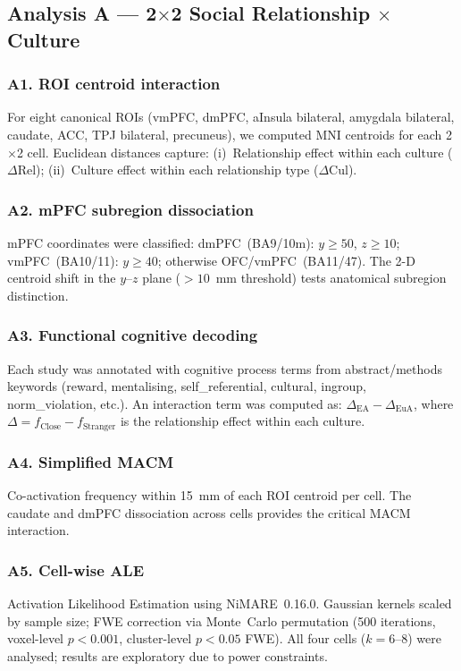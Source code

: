 \documentclass[11pt,a4paper]{article}
\begin{document}
\subsection{Analysis A — 2$\times$2 Social Relationship $\times$ Culture}

\subsubsection{A1. ROI centroid interaction}
For eight canonical ROIs (vmPFC, dmPFC, aInsula bilateral, amygdala bilateral, caudate,
ACC, TPJ bilateral, precuneus), we computed MNI centroids for each 2$\times$2 cell.
Euclidean distances capture: (i)~Relationship effect within each culture ($\Delta$Rel);
(ii)~Culture effect within each relationship type ($\Delta$Cul).

\subsubsection{A2. mPFC subregion dissociation}
mPFC coordinates were classified: dmPFC~(BA9/10m): $y\geq50$, $z\geq10$; vmPFC~(BA10/11):
$y\geq40$; otherwise OFC/vmPFC~(BA11/47). The 2-D centroid shift in the $y$--$z$ plane
($>10$~mm threshold) tests anatomical subregion distinction.

\subsubsection{A3. Functional cognitive decoding}
Each study was annotated with cognitive process terms from abstract/methods keywords
(reward, mentalising, self\_referential, cultural, ingroup, norm\_violation, etc.).
An interaction term was computed as: $\Delta_{\text{EA}} - \Delta_{\text{EuA}}$, where
$\Delta = f_{\text{Close}} - f_{\text{Stranger}}$ is the relationship effect within
each culture.

\subsubsection{A4. Simplified MACM}
Co-activation frequency within 15~mm of each ROI centroid per cell. The caudate and dmPFC
dissociation across cells provides the critical MACM interaction.

\subsubsection{A5. Cell-wise ALE}
Activation Likelihood Estimation \citep{Salo2023} using NiMARE~0.16.0. Gaussian kernels
scaled by sample size; FWE correction via Monte~Carlo permutation (500 iterations,
voxel-level $p<0.001$, cluster-level $p<0.05$ FWE). All four cells ($k=6$--8) were analysed;
results are exploratory due to power constraints.
\end{document}
